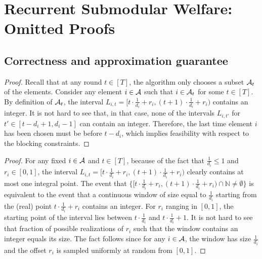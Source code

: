 \section{Recurrent Submodular Welfare: Omitted Proofs}
\subsection{Correctness and approximation guarantee}

\restatefactalwaysavailable*
\begin{proof}
Recall that at any round $t \in [T]$, the algorithm only chooses a subset $\operatorname{\mathcal{A}}_t$ of the elements. Consider any element $i \in \operatorname{\mathcal{A}}$ such that $i \in \operatorname{\mathcal{A}}_t$ for some $t \in [T]$. By definition of $\operatorname{\mathcal{A}}_t$, the interval $L_{i,t} = [t\cdot \frac{1}{d_i} + r_i, (t+1) \cdot \frac{1}{d_i} + r_i)$ contains an integer. It is not hard to see that, in that case, none of the intervals $L_{i,t'}$ for $t' \in [t-d_{i}+1, d_i - 1]$ can contain an integer. Therefore, the last time element $i$ has been chosen must be before $t- d_i$, which implies feasibility with respect to the blocking constraints.
\end{proof}



\restatefactsampling*

\begin{proof}
For any fixed $i \in \operatorname{\mathcal{A}}$ and $t \in [T]$, because of the fact that $\frac{1}{d_i} \leq 1$ and $r_i \in [0,1]$, the interval $L_{i,t} = [t\cdot \frac{1}{d_i} + r_i, (t+1) \cdot \frac{1}{d_i} + r_i)$ clearly contains at most one integral point. The event that $\{[t\cdot \frac{1}{d_i} + r_i, (t+1) \cdot \frac{1}{d_i} + r_i)\cap \mathbb{N} \neq \emptyset \}$ is equivalent to the event that a continuous window of size equal to $\frac{1}{d_i}$ starting from the (real) point $t\cdot \frac{1}{d_i} + r_i$ contains an integer. For $r_i$ ranging in $[0,1]$, the starting point of the interval lies between $t\cdot \frac{1}{d_i}$ and $t\cdot \frac{1}{d_i} + 1$. It is not hard to see that fraction of possible realizations of $r_i$ such that the window contains an integer equals its size. The fact follows since for any $i \in \operatorname{\mathcal{A}}$, the window has size $\frac{1}{d_i}$ and the offset $r_i$ is sampled uniformly at random from $[0,1]$.
\end{proof}



